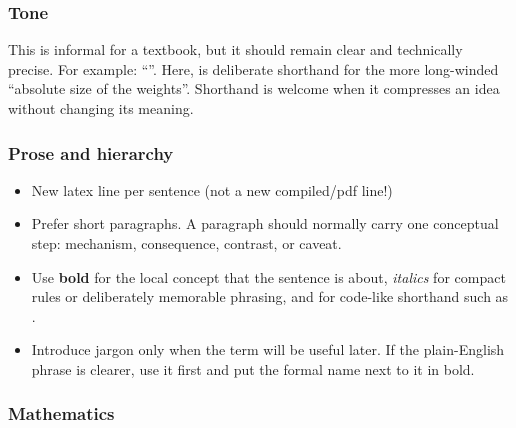 \subsubsection*{Tone}

This is informal for a textbook, but it should remain clear and technically precise.
For example: ``''.
Here,  is deliberate shorthand for the more long-winded ``absolute size of the weights''.
Shorthand is welcome when it compresses an idea without changing its meaning.


\subsubsection*{Prose and hierarchy}

\begin{itemize}
    \item New latex line per sentence (not a new compiled/pdf line!)
    \item Prefer short paragraphs. 
    A paragraph should normally carry one conceptual step: mechanism, consequence, contrast, or caveat.
    \item Use \textbf{bold} for the local concept that the sentence is about, \textit{italics} for compact rules or deliberately memorable phrasing, and  for code-like shorthand such as .
    \item Introduce jargon only when the term will be useful later. If the plain-English phrase is clearer, use it first and put the formal name next to it in bold.

\end{itemize}

\subsubsection*{Mathematics}

